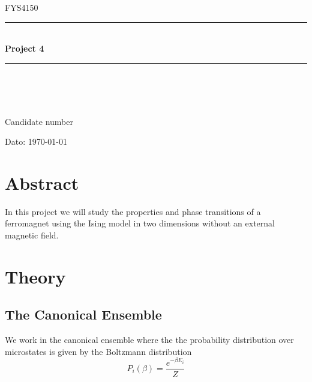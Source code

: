 \documentclass[english, 12pt]{article}
\newcommand{\f}{\frac}
\begin{document}
\begin{titlepage}
\begin{center}

\textsc{\Large FYS4150}\\[0.5cm]
\rule{\linewidth}{0.5mm} \\[0.4cm]
{ \huge \bfseries  Project 4}\\[0.10cm]
\rule{\linewidth}{0.5mm} \\[1.5cm]
\textsc{\Large }\\[1.5cm]
\textsc{}\\[1.5cm]

\begin{minipage}{0.49\textwidth}
    \begin{center} \large
        Candidate number  \\[0.8cm]
    \end{center}
\end{minipage}


\vfill

\large{Dato: \today}

\end{center}
\end{titlepage}

\section*{Abstract}

In this project we will study the properties and phase transitions of a ferromagnet using the Ising model in two dimensions without an external magnetic field.


\section{Theory}
\subsection{The Canonical Ensemble}
We work in the canonical ensemble where the the probability distribution over microstates is given by the Boltzmann distribution
$$P_i(\beta) = \f{e^{-\beta E_i}}{Z}$$
\end{document}
